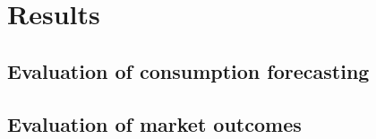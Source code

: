 
\section{Results}\label{Sec:Results}




\subsection{Evaluation of consumption forecasting}\label{Sec:Results;Subsec:Forecast}




\subsection{Evaluation of market outcomes}\label{Sec:Results;Subsec:Simulation}




